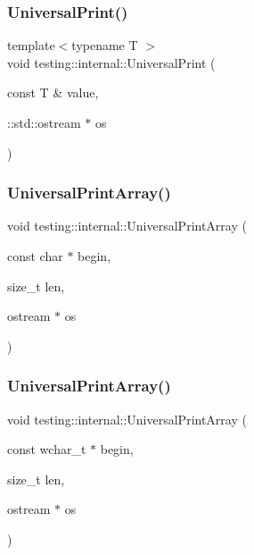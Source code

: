 \mbox{\label{namespacetesting_1_1internal_a30708fa2bacf11895b03bdb21eb72309}} 
\subsubsection{\texorpdfstring{Universal\+Print()}{UniversalPrint()}}
{\footnotesize\ttfamily template$<$typename T $>$ \\
void testing\+::internal\+::\+Universal\+Print (\begin{DoxyParamCaption}\item[{const T \&}]{value,  }\item[{\+::std\+::ostream $\ast$}]{os }\end{DoxyParamCaption})}

\mbox{\label{namespacetesting_1_1internal_a070107e7a8205ad6ec4d538d52b15b38}} 
\subsubsection{\texorpdfstring{Universal\+Print\+Array()}{UniversalPrintArray()}\hspace{0.1cm}{\footnotesize\ttfamily [1/5]}}
{\footnotesize\ttfamily void testing\+::internal\+::\+Universal\+Print\+Array (\begin{DoxyParamCaption}\item[{const char $\ast$}]{begin,  }\item[{size\+\_\+t}]{len,  }\item[{ostream $\ast$}]{os }\end{DoxyParamCaption})}

\mbox{\label{namespacetesting_1_1internal_a52394019018eb5079f9f1bcca23dcd60}} 
\subsubsection{\texorpdfstring{Universal\+Print\+Array()}{UniversalPrintArray()}\hspace{0.1cm}{\footnotesize\ttfamily [2/5]}}
{\footnotesize\ttfamily void testing\+::internal\+::\+Universal\+Print\+Array (\begin{DoxyParamCaption}\item[{const wchar\+\_\+t $\ast$}]{begin,  }\item[{size\+\_\+t}]{len,  }\item[{ostream $\ast$}]{os }\end{DoxyParamCaption})}

